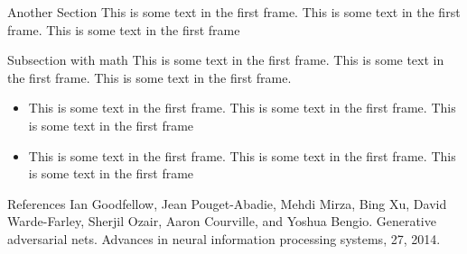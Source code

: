 \documentclass{beamer}
\begin{document}
\begin{frame}{Another Section}
  This is some text in the first frame. This is some text in the first frame. This is some
text in the first frame
\end{frame}

\begin{frame}{Subsection with math}
  This is some text in the first frame. This is some text in the first frame. This is some
text in the first frame.
   \begin{itemize}
   \item This is some text in the first frame. This is some text in the first frame. This is
    some text in the first frame
   \item This is some text in the first frame. This is some text in the first frame. This is
    some text in the first frame
   \end{itemize}
\end{frame}

\begin{frame}{References}
    Ian Goodfellow, Jean Pouget-Abadie, Mehdi Mirza, Bing Xu, David Warde-Farley, Sherjil
Ozair, Aaron Courville, and Yoshua Bengio. Generative adversarial nets. Advances in
neural information processing systems, 27, 2014.
\end{frame}
\end{document}
